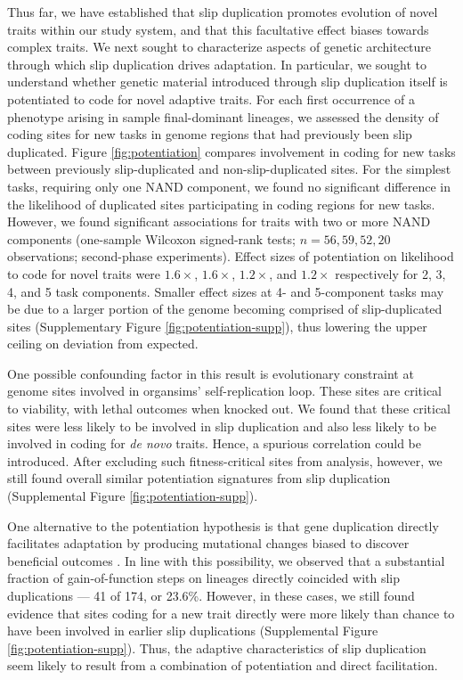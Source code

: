 Thus far, we have established that slip duplication promotes evolution of novel traits within our study system, and that this facultative effect biases towards complex traits.
We next sought to characterize aspects of genetic architecture through which slip duplication drives adaptation.
In particular, we sought to understand whether genetic material introduced through slip duplication itself is potentiated to code for novel adaptive traits.
For each first occurrence of a phenotype arising in sample final-dominant lineages, we assessed the density of coding sites for new tasks in genome regions that had previously been slip duplicated.
Figure \ref{fig:potentiation} compares involvement in coding for new tasks between previously slip-duplicated and non-slip-duplicated sites.
For the simplest tasks, requiring only one NAND component, we found no significant difference in the likelihood of duplicated sites participating in coding regions for new tasks.
However, we found significant associations for traits with two or more NAND components (one-sample Wilcoxon signed-rank tests; $n=56,59,52,20$ observations; second-phase experiments).
Effect sizes of potentiation on likelihood to code for novel traits were $1.6\times$, $1.6\times$, $1.2\times$, and $1.2\times$ respectively for 2, 3, 4, and 5 task components.
Smaller effect sizes at 4- and 5-component tasks may be due to a larger portion of the genome becoming comprised of slip-duplicated sites (Supplementary Figure \ref{fig:potentiation-supp}), thus lowering the upper ceiling on deviation from expected.

One possible confounding factor in this result is evolutionary constraint at genome sites involved in organsims' self-replication loop.
These sites are critical to viability, with lethal outcomes when knocked out.
We found that these critical sites were less likely to be involved in slip duplication and also less likely to be involved in coding for \textit{de novo} traits.
Hence, a spurious correlation could be introduced.
After excluding such fitness-critical sites from analysis, however, we still found overall similar potentiation signatures from slip duplication (Supplemental Figure \ref{fig:potentiation-supp}).

One alternative to the potentiation hypothesis is that gene duplication directly facilitates adaptation by producing mutational changes biased to discover beneficial outcomes \citep{kondrashov2012gene}.
In line with this possibility, we observed that a substantial fraction of gain-of-function steps on lineages directly coincided with slip duplications --- 41 of 174, or 23.6\%.
However, in these cases, we still found evidence that sites coding for a new trait directly were more likely than chance to have been involved in earlier slip duplications (Supplemental Figure \ref{fig:potentiation-supp}).
Thus, the adaptive characteristics of slip duplication seem likely to result from a combination of potentiation and direct facilitation.

